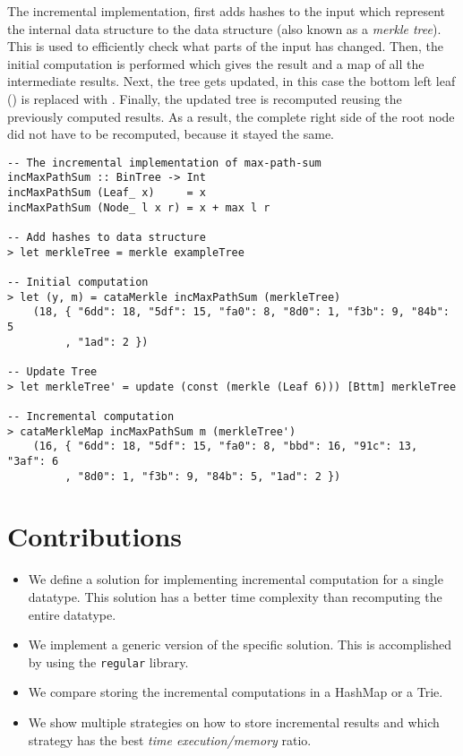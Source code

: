 The incremental implementation, first adds hashes to the input which represent the internal data structure to the data structure (also known as a \textit{merkle tree}). This is used to efficiently check what parts of the input has changed. Then, the initial computation is performed which gives the result and a map of all the intermediate results. Next, the tree gets updated, in this case the bottom left leaf () is replaced with . Finally, the updated tree is recomputed reusing the previously computed results. As a result, the complete right side of the root node did not have to be recomputed, because it stayed the same.

\begin{verbatim}
-- The incremental implementation of max-path-sum
incMaxPathSum :: BinTree -> Int
incMaxPathSum (Leaf_ x)     = x
incMaxPathSum (Node_ l x r) = x + max l r

-- Add hashes to data structure
> let merkleTree = merkle exampleTree

-- Initial computation
> let (y, m) = cataMerkle incMaxPathSum (merkleTree)
    (18, { "6dd": 18, "5df": 15, "fa0": 8, "8d0": 1, "f3b": 9, "84b": 5
         , "1ad": 2 })

-- Update Tree
> let merkleTree' = update (const (merkle (Leaf 6))) [Bttm] merkleTree

-- Incremental computation
> cataMerkleMap incMaxPathSum m (merkleTree')
    (16, { "6dd": 18, "5df": 15, "fa0": 8, "bbd": 16, "91c": 13, "3af": 6
         , "8d0": 1, "f3b": 9, "84b": 5, "1ad": 2 })
\end{verbatim}

\section{Contributions}
\begin{itemize}
    \item We define a solution for implementing incremental computation for a single datatype. This solution has a better time complexity than recomputing the entire datatype.
    \item We implement a generic version of the specific solution. This is accomplished by using the \texttt{regular} library.
    \item We compare storing the incremental computations in a HashMap or a Trie.
    \item We show multiple strategies on how to store incremental results and which strategy has the best \textit{time execution/memory} ratio. %
\end{itemize}